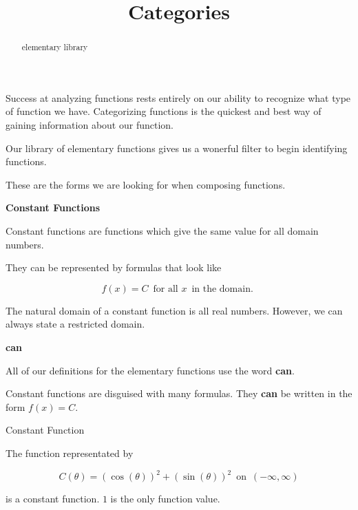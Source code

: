 \documentclass{ximera}
\title{Categories}
\begin{document}
\begin{abstract}
elementary library
\end{abstract}
\maketitle




Success at analyzing functions rests entirely on our ability to recognize what type of function we have.  Categorizing functions is the quickest and best way of gaining information about our function.

Our library of elementary functions gives us a wonerful filter to begin identifying functions.  

These are the forms we are looking for when composing functions.


\begin{template}  \textbf{\textcolor{blue!55!black}{Constant Functions}} 



Constant functions are functions which give the same value for all domain numbers. 


They can be represented by formulas that look like


\[ f(x) = C  \,  \text{ for all } x  \, \text{ in the domain. }   \]



\end{template}



The natural domain of a constant function is all real numbers.  However, we can always state a restricted domain.




\begin{warning}   \textbf{\textcolor{red!70!black}{can}}  

All of our definitions for the elementary functions use the word \textbf{\textcolor{red!70!black}{can}}.


Constant functions are disguised with many formulas.  They \textbf{\textcolor{red!70!black}{can}} be written in the form $f(x) = C$.

\end{warning}






\begin{example} Constant Function

The function representated by 

\[ C(\theta) = (\cos(\theta))^2 + (\sin(\theta))^2   \,  \text{ on } \,   (-\infty, \infty)   \]

is a constant function.   $1$ is the only function value.


\end{example}
\end{document}

